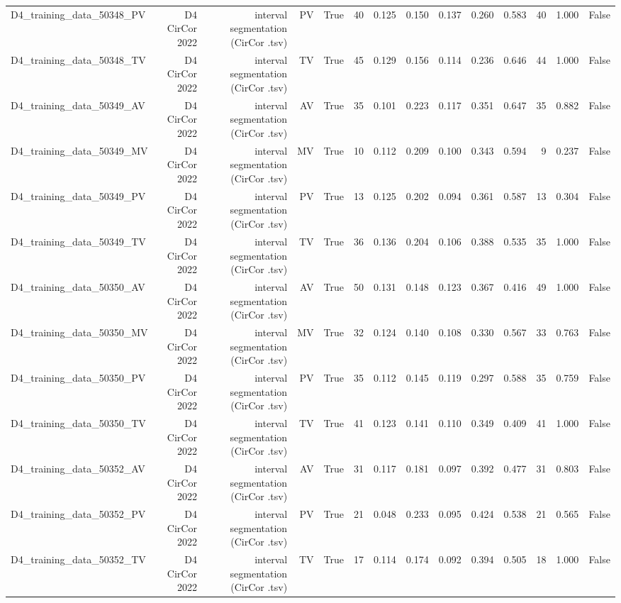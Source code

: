 \begin{table}[htbp]
\begin{tabular}{lrrrrrrrrrrrrr}
    D4\_training\_data\_50348\_PV & D4 CirCor 2022 & interval segmentation (CirCor .tsv) & PV & True & 40 & 0.125 & 0.150 & 0.137 & 0.260 & 0.583 & 40 & 1.000 & False \\
    D4\_training\_data\_50348\_TV & D4 CirCor 2022 & interval segmentation (CirCor .tsv) & TV & True & 45 & 0.129 & 0.156 & 0.114 & 0.236 & 0.646 & 44 & 1.000 & False \\
    D4\_training\_data\_50349\_AV & D4 CirCor 2022 & interval segmentation (CirCor .tsv) & AV & True & 35 & 0.101 & 0.223 & 0.117 & 0.351 & 0.647 & 35 & 0.882 & False \\
    D4\_training\_data\_50349\_MV & D4 CirCor 2022 & interval segmentation (CirCor .tsv) & MV & True & 10 & 0.112 & 0.209 & 0.100 & 0.343 & 0.594 & 9 & 0.237 & False \\
    D4\_training\_data\_50349\_PV & D4 CirCor 2022 & interval segmentation (CirCor .tsv) & PV & True & 13 & 0.125 & 0.202 & 0.094 & 0.361 & 0.587 & 13 & 0.304 & False \\
    D4\_training\_data\_50349\_TV & D4 CirCor 2022 & interval segmentation (CirCor .tsv) & TV & True & 36 & 0.136 & 0.204 & 0.106 & 0.388 & 0.535 & 35 & 1.000 & False \\
    D4\_training\_data\_50350\_AV & D4 CirCor 2022 & interval segmentation (CirCor .tsv) & AV & True & 50 & 0.131 & 0.148 & 0.123 & 0.367 & 0.416 & 49 & 1.000 & False \\
    D4\_training\_data\_50350\_MV & D4 CirCor 2022 & interval segmentation (CirCor .tsv) & MV & True & 32 & 0.124 & 0.140 & 0.108 & 0.330 & 0.567 & 33 & 0.763 & False \\
    D4\_training\_data\_50350\_PV & D4 CirCor 2022 & interval segmentation (CirCor .tsv) & PV & True & 35 & 0.112 & 0.145 & 0.119 & 0.297 & 0.588 & 35 & 0.759 & False \\
    D4\_training\_data\_50350\_TV & D4 CirCor 2022 & interval segmentation (CirCor .tsv) & TV & True & 41 & 0.123 & 0.141 & 0.110 & 0.349 & 0.409 & 41 & 1.000 & False \\
    D4\_training\_data\_50352\_AV & D4 CirCor 2022 & interval segmentation (CirCor .tsv) & AV & True & 31 & 0.117 & 0.181 & 0.097 & 0.392 & 0.477 & 31 & 0.803 & False \\
    D4\_training\_data\_50352\_PV & D4 CirCor 2022 & interval segmentation (CirCor .tsv) & PV & True & 21 & 0.048 & 0.233 & 0.095 & 0.424 & 0.538 & 21 & 0.565 & False \\
    D4\_training\_data\_50352\_TV & D4 CirCor 2022 & interval segmentation (CirCor .tsv) & TV & True & 17 & 0.114 & 0.174 & 0.092 & 0.394 & 0.505 & 18 & 1.000 & False \\

\end{tabular}
\end{table}
